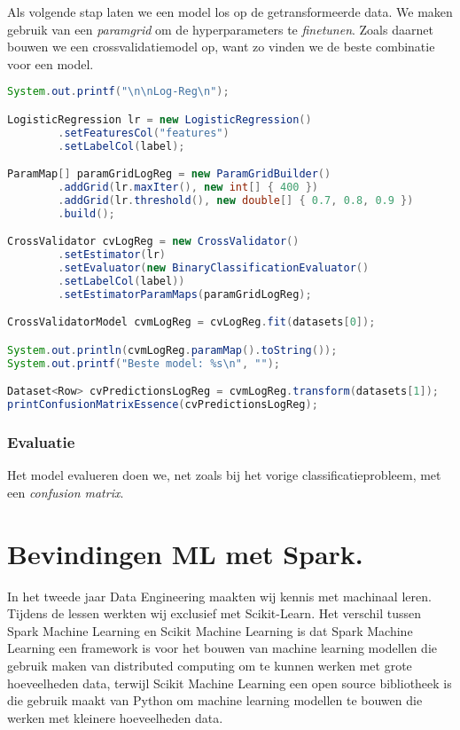 \documentclass[a4paper,10pt,twoside]{report}
\begin{document}
\newpage

Als volgende stap laten we een model los op de getransformeerde data. We maken gebruik van een \textit{paramgrid} om de hyperparameters te \textit{finetunen}. Zoals daarnet bouwen we een crossvalidatiemodel op, want zo vinden we de beste combinatie voor een model.

\begin{lstlisting}[language=Java]
System.out.printf("\n\nLog-Reg\n");

LogisticRegression lr = new LogisticRegression()
		.setFeaturesCol("features")
		.setLabelCol(label);

ParamMap[] paramGridLogReg = new ParamGridBuilder()
		.addGrid(lr.maxIter(), new int[] { 400 })
		.addGrid(lr.threshold(), new double[] { 0.7, 0.8, 0.9 })
		.build();

CrossValidator cvLogReg = new CrossValidator()
		.setEstimator(lr)
		.setEvaluator(new BinaryClassificationEvaluator()
		.setLabelCol(label))
		.setEstimatorParamMaps(paramGridLogReg);

CrossValidatorModel cvmLogReg = cvLogReg.fit(datasets[0]);

System.out.println(cvmLogReg.paramMap().toString());
System.out.printf("Beste model: %s\n", "");

Dataset<Row> cvPredictionsLogReg = cvmLogReg.transform(datasets[1]);
printConfusionMatrixEssence(cvPredictionsLogReg);
\end{lstlisting}

\subsection*{Evaluatie}

Het model evalueren doen we, net zoals bij het vorige classificatieprobleem, met een \textit{confusion matrix}.

\chapter{Bevindingen ML met Spark.}

In het tweede jaar Data Engineering maakten wij kennis met machinaal leren. Tijdens de lessen werkten wij exclusief met Scikit-Learn. Het verschil tussen Spark Machine Learning en Scikit Machine Learning is dat Spark Machine Learning een framework is voor het bouwen van machine learning modellen die gebruik maken van distributed computing om te kunnen werken met grote hoeveelheden data, terwijl Scikit Machine Learning een open source bibliotheek is die gebruik maakt van Python om machine learning modellen te bouwen die werken met kleinere hoeveelheden data.
\end{document}
